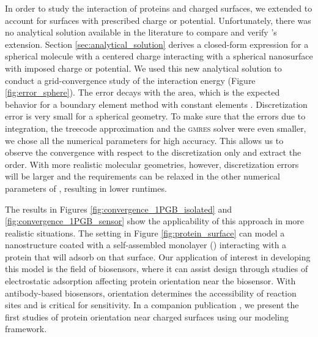 
In order to study the interaction of proteins and charged surfaces, we extended \pygbe to account for surfaces with prescribed charge or potential. Unfortunately, there was no analytical solution available in the literature to compare and verify \pygbe's extension. 
Section \ref{sec:analytical_solution} derives a closed-form expression for a spherical molecule with a centered charge interacting with a spherical nanosurface with imposed charge or potential.
We used this new analytical solution to conduct a grid-convergence study of the interaction energy (Figure \ref{fig:error_sphere}). The error decays with the area, which is the expected behavior for a boundary element method with constant elements \cite{CooperBardhanBarba2013, CooperBarba-share154331}. 
Discretization error is very small for a spherical geometry. To make sure that the errors due to integration, the treecode approximation and the \textsc{gmres} solver were even smaller, we chose all the numerical parameters for high accuracy. This allows us to observe the convergence with respect to the discretization only and extract the order. With more realistic molecular geometries, however, discretization errors will be larger and the requirements can be relaxed in the other numerical parameters of \pygbe, resulting in lower runtimes.


The results in Figures \ref{fig:convergence_1PGB_isolated} and \ref{fig:convergence_1PGB_sensor} show the applicability of this approach in more realistic situations. The setting in Figure \ref{fig:protein_surface} can model a nanostructure coated with a self-assembled monolayer (\sam) interacting with a protein that will adsorb on that surface. Our application of interest in developing this model is the field of biosensors, where it can assist design through studies of electrostatic adsorption affecting protein orientation near the biosensor. With antibody-based biosensors, orientation determines the accessibility of reaction sites and is critical for sensitivity. In a companion publication \cite{CooperBarba2015b}, we present the first studies of protein orientation near charged surfaces using our modeling framework.

